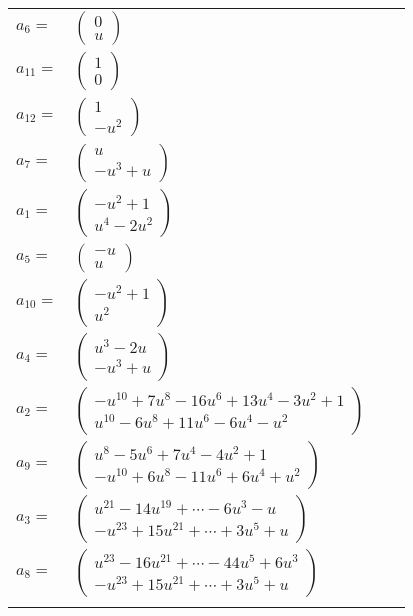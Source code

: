 \documentclass[1p]{elsarticle_modified}
\theoremstyle{definition}
\begin{document}
\begin{tabular}{m{7pt} m{180pt} m{7pt} m{180pt} }
\flushright $a_{6}=$&$\begin{pmatrix}0\\u\end{pmatrix}$ \\
\flushright $a_{11}=$&$\begin{pmatrix}1\\0\end{pmatrix}$ \\
\flushright $a_{12}=$&$\begin{pmatrix}1\\- u^2\end{pmatrix}$ \\
\flushright $a_{7}=$&$\begin{pmatrix}u\\- u^3+u\end{pmatrix}$ \\
\flushright $a_{1}=$&$\begin{pmatrix}- u^2+1\\u^4-2 u^2\end{pmatrix}$ \\
\flushright $a_{5}=$&$\begin{pmatrix}- u\\u\end{pmatrix}$ \\
\flushright $a_{10}=$&$\begin{pmatrix}- u^2+1\\u^2\end{pmatrix}$ \\
\flushright $a_{4}=$&$\begin{pmatrix}u^3-2 u\\- u^3+u\end{pmatrix}$ \\
\flushright $a_{2}=$&$\begin{pmatrix}- u^{10}+7 u^8-16 u^6+13 u^4-3 u^2+1\\u^{10}-6 u^8+11 u^6-6 u^4- u^2\end{pmatrix}$ \\
\flushright $a_{9}=$&$\begin{pmatrix}u^8-5 u^6+7 u^4-4 u^2+1\\- u^{10}+6 u^8-11 u^6+6 u^4+u^2\end{pmatrix}$ \\
\flushright $a_{3}=$&$\begin{pmatrix}u^{21}-14 u^{19}+\cdots-6 u^3- u\\- u^{23}+15 u^{21}+\cdots+3 u^5+u\end{pmatrix}$ \\
\flushright $a_{8}=$&$\begin{pmatrix}u^{23}-16 u^{21}+\cdots-44 u^5+6 u^3\\- u^{23}+15 u^{21}+\cdots+3 u^5+u\end{pmatrix}$\\&\end{tabular}
\end{document}
